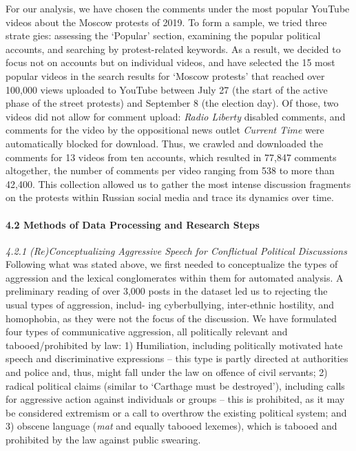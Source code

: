 For our analysis, we have chosen the comments under the most popular YouTube videos about the Moscow protests of 2019. To form a sample, we tried three strate gies: assessing the ‘Popular’ section, examining the popular political accounts, and searching by protest-related keywords. As a result, we decided to focus not on accounts but on individual videos, and have selected the 15 most popular videos in the search results for ‘Moscow protests’ that reached over 100,000 views uploaded to YouTube between July 27 (the start of the active phase of the street protests) and September 8 (the election day). Of those, two videos did not allow for comment upload: \textit{Radio Liberty} disabled comments, and comments for the video by the oppositional news outlet \textit{Current Time} were automatically blocked for download. Thus, we crawled and downloaded the comments for 13 videos from ten accounts, which resulted in 77,847 comments altogether, the number of comments per video ranging from 538 to more than 42,400. This collection allowed us to gather the most intense discussion fragments on the protests within Russian social media and trace its dynamics over time.

\paragraph{4.2 Methods of Data Processing and Research Steps}\par

\textit{4.2.1 (Re)Conceptualizing Aggressive Speech for Conflictual Political Discussions}
Following what was stated above, we first needed to conceptualize the types of aggression and the lexical conglomerates within them for automated analysis. A preliminary reading of over 3,000 posts in the dataset led us to rejecting the usual types of aggression, includ- ing cyberbullying, inter-ethnic hostility, and homophobia, as they were not the focus of the discussion. We have formulated four types of communicative aggression, all politically relevant and tabooed/prohibited by law: 1) Humiliation, including politically motivated hate speech and discriminative expressions -- this type is partly directed at authorities and police and, thus, might fall under the law on offence of civil servants; 2) radical political claims (similar to ‘Carthage must be destroyed’), including calls for aggressive action against individuals or groups -- this is prohibited, as it may be considered extremism or a call to overthrow the existing political system; and 3) obscene language (\textit{mat} and equally tabooed lexemes), which is tabooed and prohibited by the law against public swearing.


